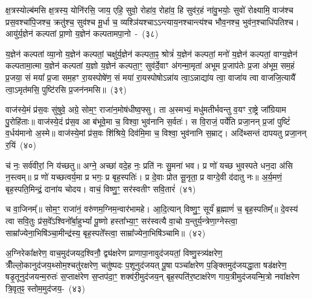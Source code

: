 {\anuvakamend[{स्क॒भ्नी॒त॒ यु॒य॒व॒न्पि॒तरा॒ द्विच॑त्वारिꣳशच्च}]}%

क्ष॒त्रस्योल्ब॑मसि क्ष॒त्रस्य॒ योनि॑रसि॒ जाय॒ एहि॒ सुवो॒ रोहा॑व॒ रोहा॑व॒ हि सुव॑र॒हं ना॑वु॒भयोः॒ सुवो॑ रोक्ष्यामि॒ वाज॑श्च प्रस॒वश्चा॑पि॒जश्च॒ क्रतु॑श्च॒ सुव॑श्च मू॒र्धा च॒ व्यश्ञि॑यश्चा\-ऽ\-ऽन्त्याय॒नश्चान्त्य॑श्च भौव॒नश्च॒ भुव॑न॒श्चाधि॑पतिश्च। आयु॑र्य॒ज्ञेन॑ कल्पतां प्रा॒णो य॒ज्ञेन॑ कल्पतामपा॒नो~-~(३८)

य॒ज्ञेन॑ कल्पतां व्या॒नो य॒ज्ञेन॑ कल्पतां॒ चक्षु॑र्य॒ज्ञेन॑ कल्पता॒ꣴ॒ श्रोत्रं॑ य॒ज्ञेन॑ कल्पतां॒ मनो॑ य॒ज्ञेन॑ कल्पतां॒ वाग्य॒ज्ञेन॑ कल्पतामा॒त्मा य॒ज्ञेन॑ कल्पतां य॒ज्ञो य॒ज्ञेन॑ कल्पता॒ꣳ॒ सुव॑र्दे॒वाꣳ अ॑गन्मा॒मृता॑ अभूम प्र॒जाप॑तेः प्र॒जा अ॑भूम॒ सम॒हं प्र॒जया॒ सं मया᳚ प्र॒जा सम॒हꣳ रा॒यस्पोषे॑ण॒ सं मया॑ रा॒यस्पोषो\-ऽन्ना॑य त्वा॒\-ऽन्नाद्या॑य त्वा॒ वाजा॑य त्वा वाजजि॒त्यायै᳚ त्वा॒\-ऽमृत॑मसि॒ पुष्टि॑रसि प्र॒जन॑नमसि॥~(३९)

{\anuvakamend[{अ॒पा॒नो वाजा॑य॒ नव॑ च}]}%

वाज॑स्ये॒मं प्र॑स॒वः सु॑षुवे॒ अग्रे॒ सोम॒ꣳ॒ राजा॑न॒मोष॑धीष्व॒फ्सु। ता अ॒स्मभ्यं॒ मधु॑मतीर्भवन्तु व॒यꣳ रा॒ष्ट्रे जा᳚ग्रियाम पु॒रोहि॑ताः॥ वाज॑स्ये॒दं प्र॑स॒व आ ब॑भूवे॒मा च॒ विश्वा॒ भुव॑नानि स॒र्वतः॑। स वि॒राजं॒ पर्ये॑ति प्रजा॒नन् प्र॒जां पुष्टिं॑ व॒र्धय॑मानो अ॒स्मे॥ वाज॑स्ये॒मां प्र॑स॒वः शि॑श्रिये॒ दिव॑मि॒मा च॒ विश्वा॒ भुव॑नानि स॒म्राट्। अदि॑थ्सन्तं दापयतु प्रजा॒नन् र॒यिं~(४०)

च॑ नः॒ सर्व॑वीरां॒ नि य॑च्छतु॥ अग्ने॒ अच्छा॑ वदे॒ह नः॒ प्रति॑ नः सु॒मना॑ भव। प्र णो॑ यच्छ भुवस्पते धन॒दा अ॑सि न॒स्त्वम्॥ प्र णो॑ यच्छत्वर्य॒मा प्र भगः॒ प्र बृह॒स्पतिः॑। प्र दे॒वाः प्रोत सू॒नृता॒ प्र वाग्दे॒वी द॑दातु नः॥ अ॒र्य॒मणं॒ बृह॒स्पति॒मिन्द्रं॒ दाना॑य चोदय। वाचं॒ विष्णु॒ꣳ॒ सर॑स्वतीꣳ सवि॒तारं॑~(४१)

च वा॒जिनम्᳚॥ सोम॒ꣳ॒ राजा॑नं॒ वरु॑णम॒ग्निम॒न्वार॑भामहे। आ॒दि॒त्यान् विष्णु॒ꣳ॒ सूर्यं॑ ब्र॒ह्माणं॑ च॒ बृह॒स्पतिम्᳚॥ दे॒वस्य॑ त्वा सवि॒तुः प्र॑स॒वे᳚\-ऽश्विनो᳚र्बा॒हु\-भ्यां᳚ पू॒ष्णो हस्ता᳚भ्या॒ꣳ॒ सर॑स्वत्यै वा॒चो य॒न्तुर्य॒न्त्रेणा॒ग्नेस्त्वा॒ साम्रा᳚ज्येना॒भिषि॑ञ्चा॒मीन्द्र॑स्य॒ बृह॒स्पते᳚स्त्वा॒ साम्रा᳚ज्येना॒भिषि॑ञ्चामि॥~(४२)

{\anuvakamend[{र॒यिꣳ स॑वि॒तार॒ꣳ॒ षट्त्रिꣳ॑शच्च}]}%

अ॒ग्निरेका᳚क्षरेण॒ वाच॒मुद॑जयद॒श्विनौ॒ द्व्य॑क्षरेण प्राणा\-पा॒ना\-वुद॑\-जयतां॒ विष्णु॒स्त्र्य॑क्षरेण॒ त्रीँल्लो॒कानुद॑जय॒थ्सोम॒श्चतु॑रक्षरेण॒ चतु॑ष्पदः प॒शूनुद॑जयत् पू॒षा पञ्चा᳚क्षरेण प॒ङ्क्तिमुद॑जयद्धा॒ता षड॑क्षरेण॒ षडृ॒तूनुद॑जयन्म॒रुतः॑ स॒प्ताक्ष॑रेण स॒प्तप॑दा॒ꣳ॒ शक्व॑री॒मुद॑जय॒न् बृह॒स्पति॑र॒ष्टाक्ष॑रेण गाय॒त्रीमुद॑जयन्मि॒त्रो नवा᳚क्षरेण त्रि॒वृत॒ꣴ॒ स्तोम॒मुद॑जय॒-~(४३)

